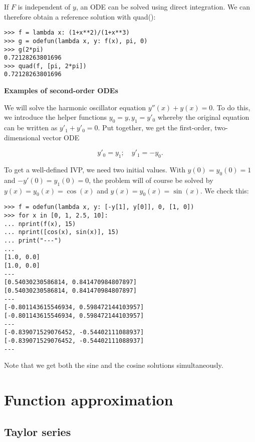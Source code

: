 If $F$ is independent of $y$, an ODE can be solved using direct integration. We can therefore obtain a reference solution with quad():

\begin{lstlisting}
>>> f = lambda x: (1+x**2)/(1+x**3)
>>> g = odefun(lambda x, y: f(x), pi, 0)
>>> g(2*pi)
0.72128263801696
>>> quad(f, [pi, 2*pi])
0.72128263801696
\end{lstlisting}


\vpara
\textbf{Examples of second-order ODEs}

We will solve the harmonic oscillator equation $y''(x)+y(x)=0$. To do this, we introduce the helper functions $y_0=y, y_1=y'_0$ whereby the original equation can be written as $y'_1+y'_0=0$. Put together, we get the first-order, two-dimensional vector ODE

\begin{equation}
y'_0 = y_1; \quad y'_1 = -y_0.
\end{equation}


To get a well-defined IVP, we need two initial values. With $y(0)=y_0(0)=1$ and $-y'(0)=y_1(0)=0$, the problem will of course be solved by $y(x)=y_0(x)=\cos(x)$ and $y(x)=y_0(x)=\sin(x)$. We check this:

\begin{lstlisting}
>>> f = odefun(lambda x, y: [-y[1], y[0]], 0, [1, 0])
>>> for x in [0, 1, 2.5, 10]:
... nprint(f(x), 15)
... nprint([cos(x), sin(x)], 15)
... print("---")
...
[1.0, 0.0]
[1.0, 0.0]
---
[0.54030230586814, 0.841470984807897]
[0.54030230586814, 0.841470984807897]
---
[-0.801143615546934, 0.598472144103957]
[-0.801143615546934, 0.598472144103957]
---
[-0.839071529076452, -0.54402111088937]
[-0.839071529076452, -0.54402111088937]
---
\end{lstlisting}

Note that we get both the sine and the cosine solutions simultaneously.








\newpage
\chapter{Function approximation}

\section{Taylor series}


